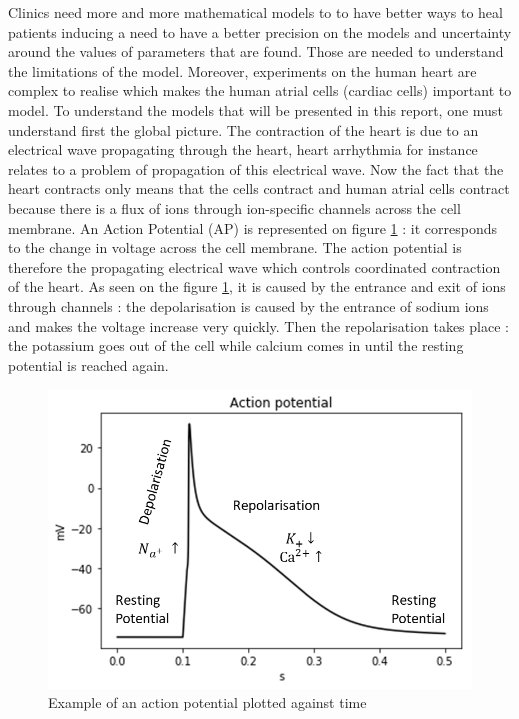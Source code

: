 \documentclass[11pt]{report}
\begin{document}
Clinics need more and more mathematical models to to have better ways to heal patients inducing a need to have a better precision on the models and uncertainty around the values of parameters that are found. Those are needed to understand the limitations of the model. Moreover, experiments on the human heart are complex to realise which makes the human atrial cells (cardiac cells) important to model. To understand the models that will be presented in this report, one must understand first the global picture. The contraction of the heart is due to an electrical wave propagating through the heart, heart arrhythmia for instance relates to a problem of propagation of this electrical wave. Now the fact that the heart contracts only means that the cells contract and human atrial cells contract because there is a flux of ions through ion-specific channels across the cell membrane. An Action Potential (AP) is represented on figure \ref{fig:AP} : it corresponds to the change in voltage across the cell membrane. The action potential is therefore the propagating electrical wave which controls coordinated contraction of the heart.
As seen on the figure \ref{fig:AP}, it is caused by the entrance and exit of ions through channels : the depolarisation is caused by the entrance of sodium ions and makes the voltage increase very quickly. Then the repolarisation takes place : the potassium goes out of the cell while calcium comes in until the resting potential is reached again.

\begin{figure}[H]
    \centering
    \begin{measuredfigure}
    \includegraphics[scale = 0.75]{figures/AP.png}
    \captionsetup{singlelinecheck = false, format= hang, justification=raggedright, font=footnotesize, labelsep=space}
	\caption{Example of an action potential plotted against time}
	\end{measuredfigure}
      \addtocounter{figure}{-1}
	\label{fig:AP}
\end{figure}
\end{document}
